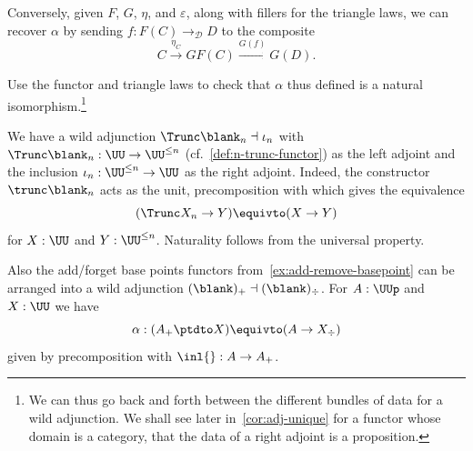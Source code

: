 Conversely, given $F$, $G$, $\eta$, and $\varepsilon$, along with
fillers for the triangle laws, we can recover $\alpha$
by sending $f : F(C) \to_{\mathcal D} D$ to
the composite
\[
  C \xrightarrow{\eta_C} GF(C) \xrightarrow{G(f)} G(D).
\]
\begin{xca}\label{xca:adj-from-triangles}
  Use the functor and triangle laws to check that $\alpha$ thus
  defined is a natural isomorphism.\footnote{%
    We can thus go back and forth between
    the different bundles of data for a wild adjunction.
    We shall see later in~\cref{cor:adj-unique} for a functor
    whose domain is a category,
    that the data of a right adjoint is a proposition.}
\end{xca}

\begin{example}\label{ex:trunc-adj}
  We have a wild adjunction $\Trunc\blank_n \dashv \iota_n$
  with $\Trunc\blank_n : \UU \to \UU^{\le n}$ (cf.~\cref{def:n-trunc-functor})
  as the left adjoint
  and the inclusion $\iota_n : \UU^{\le n} \to \UU$ as the right adjoint.
  Indeed, the constructor $\trunc\blank_n$ acts as the unit, precomposition with which
  gives the equivalence
  \[
    (\Trunc X_n \to Y) \equivto (X \to Y)
  \]
  for $X : \UU$ and $Y : \UU^{\le n}$. Naturality follows from the universal property.
\end{example}
\begin{example}\label{ex:pt-unpt-adj}
  Also the add/forget base points functors
  from~\cref{ex:add-remove-basepoint} can be arranged
  into a wild adjunction $(\blank)_+ \dashv (\blank)_\div$.
  For $A : \UUp$ and $X : \UU$ we have
  \[
    \alpha : (A_+ \ptdto X) \equivto (A \to X_\div)
  \]
  given by precomposition with $\inl{} : A \to A_+$.
\end{example}

